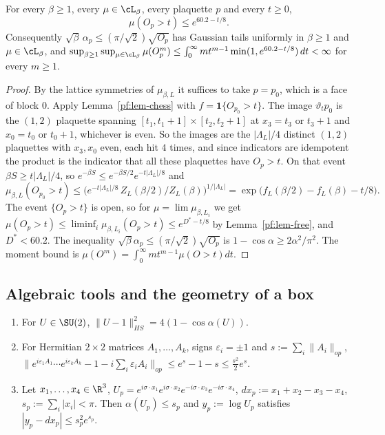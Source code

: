 \begin{corollary}\label{pf:cor-tail}
For every $\beta\ge1$, every $\mu\in\cL_\beta$, every plaquette $p$ and every $t\ge0$,
\[
\mu(O_p>t)\le e^{60.2-t/8}.
\]
Consequently $\sqrt\beta\,\alpha_p\le(\pi/\sqrt2)\sqrt{O_p}$ has Gaussian tails uniformly in $\beta\ge1$ and $\mu\in\cL_\beta$, and $\sup_{\beta\ge1}\sup_{\mu\in\cL_\beta}\mu(O_p^m)\le\int_0^\infty mt^{m-1}\min(1,e^{60.2-t/8})\,dt<\infty$ for every $m\ge1$.
\end{corollary}

\begin{proof}
By the lattice symmetries of $\mu_{\beta,L}$ it suffices to take $p=p_0$, which is a face of block $0$. Apply Lemma~\ref{pf:lem-chess} with $f=\mathbf 1\{O_{p_0}>t\}$. The image $\vartheta_tp_0$ is the $(1,2)$ plaquette spanning $[t_1,t_1+1]\times[t_2,t_2+1]$ at $x_3=t_3$ or $t_3+1$ and $x_0=t_0$ or $t_0+1$, whichever is even. So the images are the $|\Lambda_L|/4$ distinct $(1,2)$ plaquettes with $x_3,x_0$ even, each hit $4$ times, and since indicators are idempotent the product is the indicator that all these plaquettes have $O_p>t$. On that event $\beta S\ge t|\Lambda_L|/4$, so $e^{-\beta S}\le e^{-\beta S/2}e^{-t|\Lambda_L|/8}$ and
\[
\mu_{\beta,L}(O_{p_0}>t)\le\Big(e^{-t|\Lambda_L|/8}\,Z_L(\beta/2)/Z_L(\beta)\Big)^{1/|\Lambda_L|}=\exp\big(f_L(\beta/2)-f_L(\beta)-t/8\big).
\]
The event $\{O_p>t\}$ is open, so for $\mu=\lim\mu_{\beta,L_i}$ we get $\mu(O_p>t)\le\liminf_i\mu_{\beta,L_i}(O_p>t)\le e^{D^*-t/8}$ by Lemma~\ref{pf:lem-free}, and $D^*<60.2$. The inequality $\sqrt\beta\alpha_p\le(\pi/\sqrt2)\sqrt{O_p}$ is $1-\cos\alpha\ge2\alpha^2/\pi^2$. The moment bound is $\mu(O^m)=\int_0^\infty mt^{m-1}\mu(O>t)dt$.
\end{proof}

\subsection{Algebraic tools and the geometry of a box}\label{pf:sec-box}

\begin{lemma}\label{pf:lem-E}
\leavevmode
\begin{enumerate}
\item[(E1)] For $U\in\SU(2)$, $\|U-1\|_{HS}^2=4(1-\cos\alpha(U))$.
\item[(E2)] For Hermitian $2\times2$ matrices $A_1,\dots,A_k$, signs $\varepsilon_i=\pm1$ and $s:=\sum_i\|A_i\|_{op}$,
$\big\|e^{i\varepsilon_1A_1}\cdots e^{i\varepsilon_kA_k}-1-i\sum_i\varepsilon_iA_i\big\|_{op}\le e^s-1-s\le\tfrac{s^2}2e^s$.
\item[(E3)] Let $x_1,\dots,x_4\in\R^3$, $U_p=e^{i\sigma\cdot x_1}e^{i\sigma\cdot x_2}e^{-i\sigma\cdot x_3}e^{-i\sigma\cdot x_4}$, $dx_p:=x_1+x_2-x_3-x_4$, $s_p:=\sum_i|x_i|<\pi$. Then $\alpha(U_p)\le s_p$ and $y_p:=\log U_p$ satisfies $|y_p-dx_p|\le s_p^2e^{s_p}$.
\end{enumerate}
\end{lemma}

